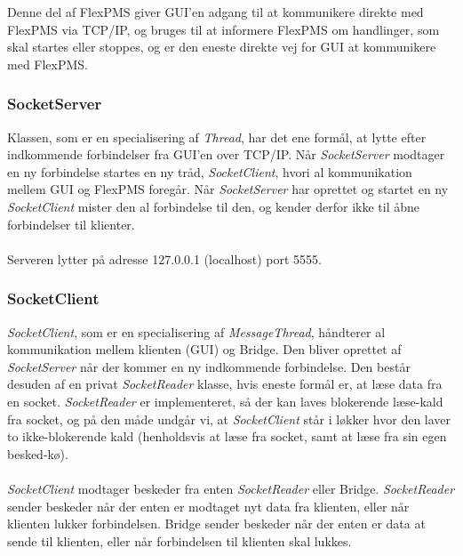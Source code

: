 Denne del af FlexPMS giver GUI'en adgang til at kommunikere direkte med FlexPMS via TCP/IP, og bruges til at informere FlexPMS om handlinger, som skal startes eller stoppes, og er den eneste direkte vej for GUI at kommunikere med FlexPMS.




\subsubsection{SocketServer}
Klassen, som er en specialisering af \textit{Thread}, har det ene formål, at lytte efter indkommende forbindelser fra GUI’en over TCP/IP. Når \textit{SocketServer} modtager en ny forbindelse startes en ny tråd, \textit{SocketClient}, hvori al kommunikation mellem GUI og FlexPMS foregår. Når \textit{SocketServer} har oprettet og startet en ny \textit{SocketClient} mister den al forbindelse til den, og kender derfor ikke til åbne forbindelser til klienter.\\\\

Serveren lytter på adresse 127.0.0.1 (localhost) port 5555.



\subsubsection{SocketClient}

\textit{SocketClient}, som er en specialisering af \textit{MessageThread}, håndterer al kommunikation mellem klienten (GUI) og Bridge. Den bliver oprettet af \textit{SocketServer} når der kommer en ny indkommende forbindelse. Den består desuden af en privat \textit{SocketReader} klasse, hvis eneste formål er, at læse data fra en socket. \textit{SocketReader} er implementeret, så der kan laves blokerende læse-kald fra socket, og på den måde undgår vi, at \textit{SocketClient} står i løkker hvor den laver to ikke-blokerende kald (henholdsvis at læse fra socket, samt at læse fra sin egen besked-kø).\\\\

\textit{SocketClient} modtager beskeder fra enten \textit{SocketReader} eller Bridge. \textit{SocketReader} sender beskeder når der enten er modtaget nyt data fra klienten, eller når klienten lukker forbindelsen. Bridge sender beskeder når der enten er data at sende til klienten, eller når forbindelsen til klienten skal lukkes.\\\\

